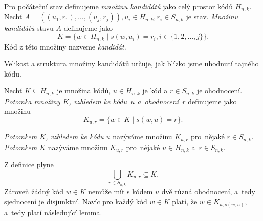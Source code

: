 \begin{definice}\label{kandidat}
  Pro počáteční stav definujeme \emph{množinu kandidátů} jako celý prostor kódů $H_{n,k}$. Nechť $A = \left((u_1, r_1), \dots, (u_j,r_j)\right), u_i \in H_{n,k}, r_i \in S_{n,k}$ je stav. \emph{Množinu kandidátů} stavu $A$ definujeme jako
  \[K = \{w \in H_{n,k} \mid s(w,u_i) = r_i,  i \in \{1,2,\dots ,j\} \}.\]
  Kód z této množiny nazveme \emph{kandidát}. 
  

\end{definice}
Velikost a struktura množiny kandidátů určuje, jak blízko jsme uhodnutí tajného kódu.
\begin{definice}\label{defpotomekmnoziny}
  Nechť $K \subseteq H_{n,k}$ je množina kódů, $u \in H_{n,k}$ je kód a $r \in S_{n,k}$ je ohodnocení. \emph{Potomka množiny $K$, vzhledem ke kódu~$u$ a~ohodnocení~$r$} definujeme jako množinu 
  \[K_{u,r} = \{w \in K \mid s(w,u) = r\}.\] 
\end{definice}
\begin{pozn}
    \emph{Potomkem $K$, vzhledem ke kódu $u$} nazýváme množinu $K_{u,r}$ pro~nějaké $r \in S_{n,k}$. \emph{Potomkem $K$} nazýváme množinu $K_{u,r}$ pro~nějaké $u\in H_{n,k}$ a~$r \in S_{n,k}$. 
\end{pozn}
Z definice plyne
\[\bigcup_{r\in S_{n,k}} K_{u,r} \subseteq K.\] Zároveň žádný kód $w \in K$ nemůže mít s kódem $u$ dvě různá ohodnocení, a~tedy sjednocení je disjunktní. Navíc pro každý kód $w \in K$ platí, že $w \in K_{u, s(w,u)}$, a~tedy platí následující lemma.

